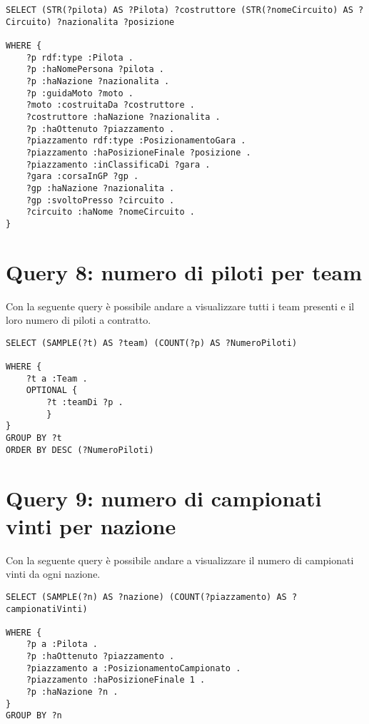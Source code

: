 \begin{lstlisting}[captionpos=b, caption=Piazzamenti "patriottici", label=lst:sparql7,
   basicstyle=\ttfamily,frame=single]
SELECT (STR(?pilota) AS ?Pilota) ?costruttore (STR(?nomeCircuito) AS ?Circuito) ?nazionalita ?posizione

WHERE {
	?p rdf:type :Pilota .
	?p :haNomePersona ?pilota .
	?p :haNazione ?nazionalita .
	?p :guidaMoto ?moto .
	?moto :costruitaDa ?costruttore .
	?costruttore :haNazione ?nazionalita .
	?p :haOttenuto ?piazzamento .
	?piazzamento rdf:type :PosizionamentoGara .
	?piazzamento :haPosizioneFinale ?posizione .
	?piazzamento :inClassificaDi ?gara .
	?gara :corsaInGP ?gp .
	?gp :haNazione ?nazionalita .
	?gp :svoltoPresso ?circuito .
	?circuito :haNome ?nomeCircuito .
}
\end{lstlisting}

\section{Query 8: numero di piloti per team}

Con la seguente query è possibile andare a visualizzare tutti i team presenti e il loro numero di piloti a contratto.
\\

\begin{lstlisting}[captionpos=b, caption=Numero di piloti per team, label=lst:sparql8,
   basicstyle=\ttfamily,frame=single]
SELECT (SAMPLE(?t) AS ?team) (COUNT(?p) AS ?NumeroPiloti)

WHERE {
	?t a :Team .
	OPTIONAL {
		?t :teamDi ?p .
		}
}
GROUP BY ?t
ORDER BY DESC (?NumeroPiloti)
\end{lstlisting}

\newpage

\section{Query 9: numero di campionati vinti per nazione}

Con la seguente query è possibile andare a visualizzare il numero di campionati vinti da ogni nazione.
\\

\begin{lstlisting}[captionpos=b, caption=Numero di campionati vinti per nazione, label=lst:sparql9,
   basicstyle=\ttfamily,frame=single]
SELECT (SAMPLE(?n) AS ?nazione) (COUNT(?piazzamento) AS ?campionatiVinti) 

WHERE {
	?p a :Pilota .
	?p :haOttenuto ?piazzamento .
	?piazzamento a :PosizionamentoCampionato .
	?piazzamento :haPosizioneFinale 1 .	
	?p :haNazione ?n .
}
GROUP BY ?n
\end{lstlisting}
